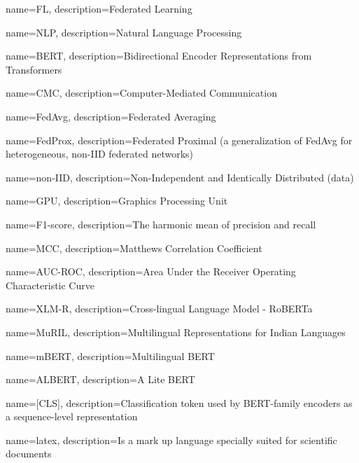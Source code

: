 \makeglossaries

{
    name={FL},
    description={Federated Learning}
}

{
    name={NLP},
    description={Natural Language Processing}
}

{
    name={BERT},
    description={Bidirectional Encoder Representations from Transformers}
}

{
    name={CMC},
    description={Computer-Mediated Communication}
}

{
    name={FedAvg},
    description={Federated Averaging}
}

{
    name={FedProx},
    description={Federated Proximal (a generalization of FedAvg for heterogeneous, non-IID federated networks)}
}

{
    name={non-IID},
    description={Non-Independent and Identically Distributed (data)}
}

{
    name={GPU},
    description={Graphics Processing Unit}
}

{
    name={F1-score},
    description={The harmonic mean of precision and recall}
}

{
    name={MCC},
    description={Matthews Correlation Coefficient}
}

{
    name={AUC-ROC},
    description={Area Under the Receiver Operating Characteristic Curve}
}

{
    name={XLM-R},
    description={Cross-lingual Language Model - RoBERTa}
}

{
    name={MuRIL},
    description={Multilingual Representations for Indian Languages}
}

{
    name={mBERT},
    description={Multilingual BERT}
}

{
    name={ALBERT},
    description={A Lite BERT}
}

{
    name={[CLS]},
    description={Classification token used by BERT-family encoders as a sequence-level representation}
}

{
    name=latex,
    description={Is a mark up language specially suited
    for scientific documents}
}
